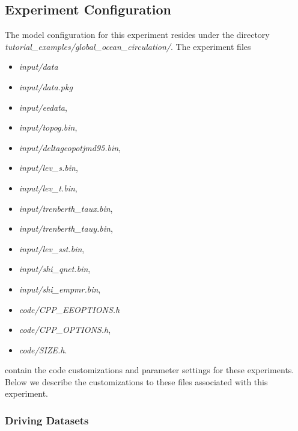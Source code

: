 \subsection{Experiment Configuration}
\label{www:tutorials}
\label{SEC:eg-globalpressure-config}

The model configuration for this experiment resides under the 
directory {\it tutorial\_examples/global\_ocean\_circulation/}.  
The experiment files 

\begin{itemize}
\item {\it input/data}
\item {\it input/data.pkg}
\item {\it input/eedata},
\item {\it input/topog.bin},
\item {\it input/deltageopotjmd95.bin},
\item {\it input/lev\_s.bin},
\item {\it input/lev\_t.bin},
\item {\it input/trenberth\_taux.bin},
\item {\it input/trenberth\_tauy.bin},
\item {\it input/lev\_sst.bin},
\item {\it input/shi\_qnet.bin},
\item {\it input/shi\_empmr.bin},
\item {\it code/CPP\_EEOPTIONS.h}
\item {\it code/CPP\_OPTIONS.h},
\item {\it code/SIZE.h}. 
\end{itemize}
contain the code customizations and parameter settings for these
experiments. Below we describe the customizations
to these files associated with this experiment.

\subsubsection{Driving Datasets}
\label{www:tutorials}

